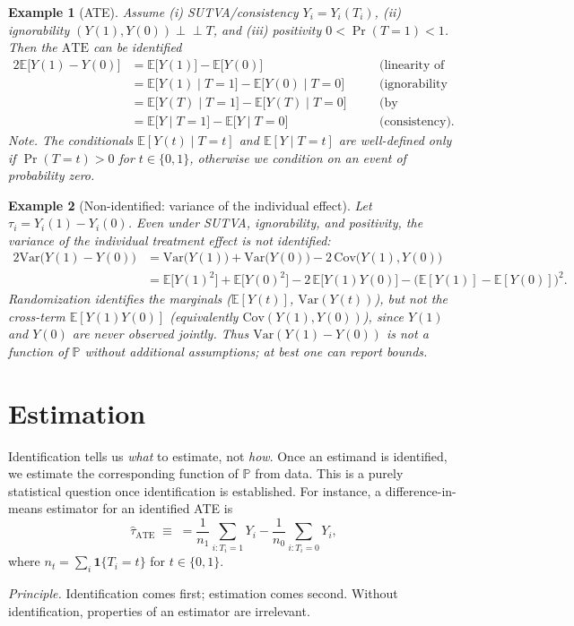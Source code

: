 \documentclass[11pt]{exam}
\theoremstyle{plain}
\newtheorem{example}{Example}
\newcommand{\E}{\mathbb{E}}
\begin{document}
\begin{example}[ATE]
Assume (i) SUTVA/consistency $Y_i=Y_i(T_i)$, (ii) ignorability $(Y(1),Y(0)) \perp\!\!\!\perp T$, and (iii) positivity $0<\Pr(T=1)<1$.
Then the $\mathrm{ATE}$ can be identified
\begin{alignat*}{2}
\E\!\big[Y(1)-Y(0)\big]
&= \E\!\big[Y(1)\big] - \E\!\big[Y(0)\big]  &\quad& \text{(linearity of expectation)}\\[2pt]
&= \E\!\big[Y(1)\mid T=1\big] - \E\!\big[Y(0)\mid T=0\big]  &\quad& \text{(ignorability \& positivity)}\\[2pt]
&= \E\!\big[Y(T)\mid T=1\big] - \E\!\big[Y(T)\mid T=0\big]  &\quad& \text{(by conditioning)}\\[2pt]
&= \E\!\big[Y\mid T=1\big] - \E\!\big[Y\mid T=0\big]        &\quad& \text{(consistency).}
\end{alignat*}
\emph{Note.} The conditionals $\E[Y(t) \mid T=t]$ and $\E[Y\mid T=t]$ are well-defined only if $\Pr(T=t) > 0$ for $t \in \{0, 1\}$, otherwise we condition on an event of probability zero.
\end{example}

\begin{example}[Non-identified: variance of the individual effect]
Let $\tau_i=Y_i(1)-Y_i(0)$. Even under SUTVA, ignorability, and positivity,
\emph{the variance of the individual treatment effect is not identified}:
\begin{alignat*}{2}
\mathrm{Var}\!\big(Y(1)-Y(0)\big)
&= \mathrm{Var}\!\big(Y(1)\big) + \mathrm{Var}\!\big(Y(0)\big) - 2\,\mathrm{Cov}\!\big(Y(1),Y(0)\big)
\\ 
&= \E\!\big[Y(1)^2\big]+\E\!\big[Y(0)^2\big]-2\,\E\!\big[Y(1)Y(0)\big] - \big(\E[Y(1)]-\E[Y(0)]\big)^2. &&
\end{alignat*}
Randomization identifies the \emph{marginals} ($\E[Y(t)]$, $\mathrm{Var}(Y(t))$), but not the \emph{cross-term}
$\E[Y(1)Y(0)]$ (equivalently $\mathrm{Cov}(Y(1),Y(0))$), since $Y(1)$ and $Y(0)$ are never observed jointly.
Thus $\mathrm{Var}(Y(1)-Y(0))$ is not a function of $\mathbb{P}$ without additional assumptions; at best one can report bounds.
\end{example}

\section{Estimation}

Identification tells us \emph{what} to estimate, not \emph{how}. Once an estimand is identified, we estimate the corresponding function of $\mathbb{P}$ from data. This is a purely statistical question once identification is established. For instance, a difference-in-means estimator for an identified ATE is
\[
\widehat{\tau}_{\mathrm{ATE}} \;\equiv\; =\frac{1}{n_1}\sum_{i:T_i=1}Y_i-\frac{1}{n_0}\sum_{i:T_i=0}Y_i,
\]
where $n_t=\sum_i \mathbf{1}\{T_i=t\}$ for $t\in\{0,1\}$.

\medskip
\textit{Principle.} Identification comes first; estimation comes second.
Without identification, properties of an estimator are irrelevant.
\endgroup


\end{document}
